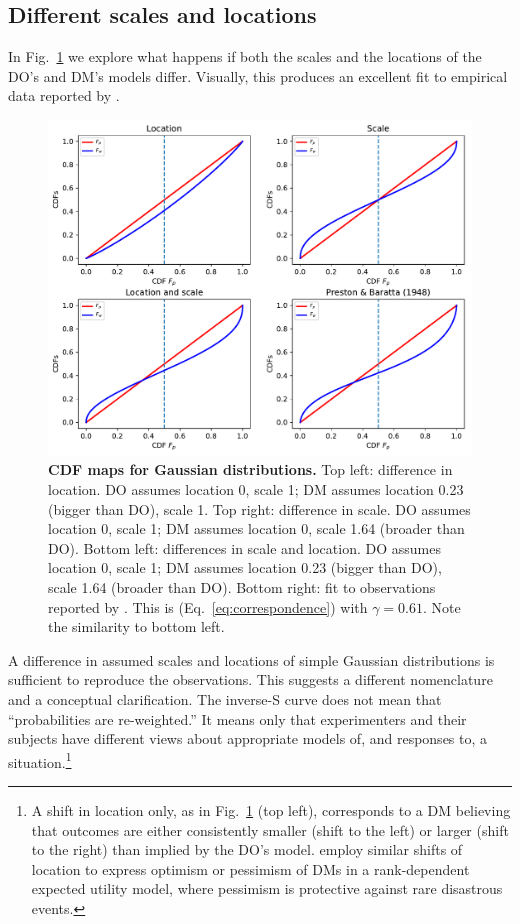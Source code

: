 \documentclass[12pt,letter,timesnewroman]{article}
\newcommand{\eref}[1]{(Eq.~\ref{eq:#1})}
\newcommand{\flabel}[1]{\label{fig:#1}}
\newcommand{\fref}[1]{Fig.~\ref{fig:#1}}
\newcommand{\seclabel}[1]{\label{sec:#1}}
\begin{document}

\subsection{Different scales and locations\seclabel{A_mismatch}}

In \fref{Gauss_scale_location_both_KT} we explore what happens if both the scales and the locations of the DO's and DM's models differ. Visually, this produces an excellent fit to empirical data reported by \textcite{PrestonBaratta1948}.
\begin{figure}[!htb]
\centering
\includegraphics[width=1.0\textwidth]{../../figs/Gauss_scale_location_both_KT.pdf}
\caption{\textbf{CDF maps for Gaussian distributions.} Top left: difference in location. DO assumes location 0, scale 1; DM assumes location 0.23 (bigger than DO), scale 1. Top right: difference in scale. DO assumes location 0, scale 1; DM assumes location 0, scale 1.64 (broader than DO). Bottom left: differences in scale and location. DO assumes location 0, scale 1; DM assumes location 0.23 (bigger than DO), scale 1.64 (broader than DO). Bottom right: fit to observations reported by \textcite{PrestonBaratta1948}. This is \eref{correspondence} with $\gamma=0.61$. Note the similarity to bottom left.}
\flabel{Gauss_scale_location_both_KT}
\end{figure}
A difference in assumed scales and locations of simple Gaussian distributions is sufficient to reproduce the observations. This suggests a different nomenclature and a conceptual clarification. The inverse-S curve does not mean that ``probabilities are re-weighted.'' It means only that experimenters and their subjects have different views about appropriate models of, and responses to, a situation.\footnote{A shift in location only, as in \fref{Gauss_scale_location_both_KT} (top left), corresponds to a DM believing that outcomes are either consistently smaller (shift to the left) or larger (shift to the right) than implied by the DO's model. \textcite{PriceJones2020} employ similar shifts of location to express optimism or pessimism of DMs in a rank-dependent expected utility model, where pessimism is protective against rare disastrous events.}
\end{document}

